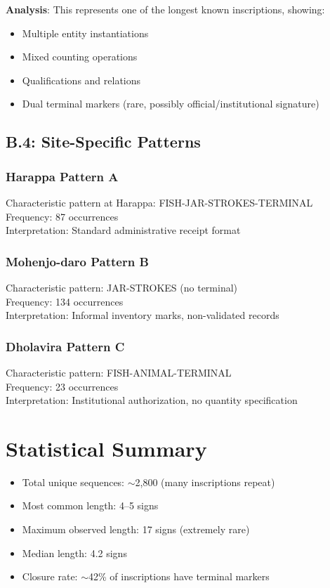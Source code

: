 \textbf{Analysis}: This represents one of the longest known inscriptions, showing:
\begin{itemize}
    \item Multiple entity instantiations
    \item Mixed counting operations
    \item Qualifications and relations
    \item Dual terminal markers (rare, possibly official/institutional signature)
\end{itemize}

\subsection*{B.4: Site-Specific Patterns}

\subsubsection*{Harappa Pattern A}
Characteristic pattern at Harappa: FISH-JAR-STROKES-TERMINAL \\
Frequency: 87 occurrences \\
Interpretation: Standard administrative receipt format

\subsubsection*{Mohenjo-daro Pattern B}
Characteristic pattern: JAR-STROKES (no terminal) \\
Frequency: 134 occurrences \\
Interpretation: Informal inventory marks, non-validated records

\subsubsection*{Dholavira Pattern C}
Characteristic pattern: FISH-ANIMAL-TERMINAL \\
Frequency: 23 occurrences \\
Interpretation: Institutional authorization, no quantity specification

\section*{Statistical Summary}

\begin{itemize}
    \item Total unique sequences: $\sim$2,800 (many inscriptions repeat)
    \item Most common length: 4--5 signs
    \item Maximum observed length: 17 signs (extremely rare)
    \item Median length: 4.2 signs
    \item Closure rate: $\sim$42\% of inscriptions have terminal markers
\end{itemize}
